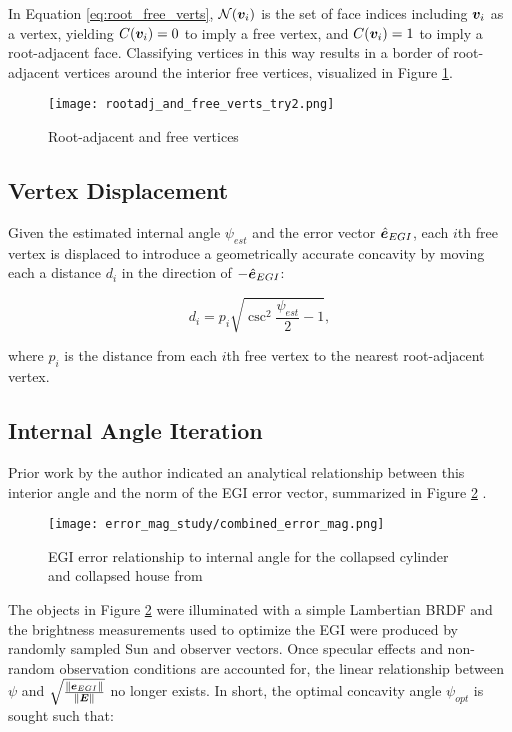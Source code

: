 In Equation \ref{eq:root_free_verts}, $\mathcal{N}(\bm{v}_i)$ is the set of face indices including $\bm{v}_i$ as a vertex, yielding $C(\bm{v}_i) = 0$ to imply a free vertex, and $C(\bm{v}_i) = 1$ to imply a root-adjacent face. Classifying vertices in this way results in a border of root-adjacent vertices around the interior free vertices, visualized in Figure \ref{fig:root_and_free}.

\begin{figure}[!htb]
  \centering
  \texttt{[image: rootadj\_and\_free\_verts\_try2.png]}
  \caption{Root-adjacent and free vertices}
  \label{fig:root_and_free}
\end{figure}

\subsection{Vertex Displacement}

Given the estimated internal angle $\psi_{est}$ and the error vector $\hat{\bm{e}}_{EGI}$, each $i$th free vertex is displaced to introduce a geometrically accurate concavity by moving each a distance $d_i$ in the direction of $-\hat{\bm{e}}_{EGI}$:

\begin{equation} \label{eq:flip_depth}
  d_i = p_i \sqrt{\csc^2 \frac{\psi_{est}}{2} - 1},
\end{equation}

where $p_i$ is the distance from each $i$th free vertex to the nearest root-adjacent vertex.

\subsection{Internal Angle Iteration}

Prior work by the author indicated an analytical relationship between this interior angle and the norm of the EGI error vector, summarized in Figure \ref{fig:misleading_egi_error} \cite{robinson2022}.

\begin{figure}[!htb]
  \centering
  \texttt{[image: error\_mag\_study/combined\_error\_mag.png]}
  \caption{EGI error relationship to internal angle for the collapsed cylinder and collapsed house from \cite{robinson2022}}
  \label{fig:misleading_egi_error}
\end{figure}

The objects in Figure \ref{fig:misleading_egi_error} were illuminated with a simple Lambertian BRDF and the brightness measurements used to optimize the EGI were produced by randomly sampled Sun and observer vectors. Once specular effects and non-random observation conditions are accounted for, the linear relationship between $\psi$ and $\sqrt{\frac{\|\bm{e}_{EGI}\|}{\|\bm{E}\|}}$ no longer exists. In short, the optimal concavity angle $\psi_{opt}$ is sought such that:

